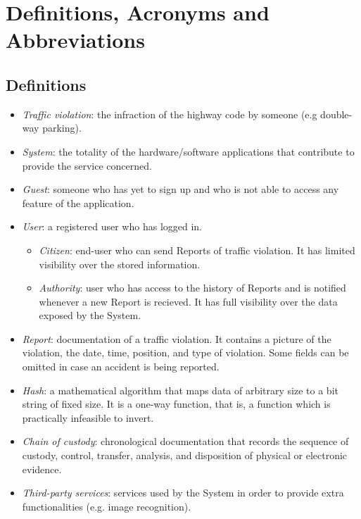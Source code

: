 \documentclass{report}
\begin{document}
\section{Definitions, Acronyms and Abbreviations}
\subsection{Definitions}
\begin{itemize}
	\item \textit{Traffic violation}: the infraction of the highway code by someone (e.g double-way parking).
	\item \textit{System}: the totality of the hardware/software applications that contribute to provide the service concerned.
    \item \textit{Guest}: someone who has yet to sign up and who is not able to access any feature of the application.
    \item \textit{User}: a registered user who has logged in.
	\begin{itemize}
		\item \textit{Citizen}: end-user who can send Reports of traffic violation. It has limited visibility over the stored information.
		\item \textit{Authority}: user who has access to the history of Reports and is notified whenever a new Report is recieved. It has full visibility over the data exposed by the System.
	\end{itemize} 
    \item \textit{Report}: documentation of a traffic violation. It contains a picture of the violation, the date, time, position, and type of violation. Some fields can be omitted in case an accident is being reported.
    \item \textit{Hash}: a mathematical algorithm that maps data of arbitrary size to a bit string of fixed size. It is a one-way function, that is, a function which is practically infeasible to invert.
    \item \textit{Chain of custody}: chronological documentation that records the sequence of custody, control, transfer, analysis, and disposition of physical or electronic evidence.
    \item \textit{Third-party services}: services used by the System in order to provide extra functionalities (e.g. image recognition).
\end{itemize}
\end{document}
